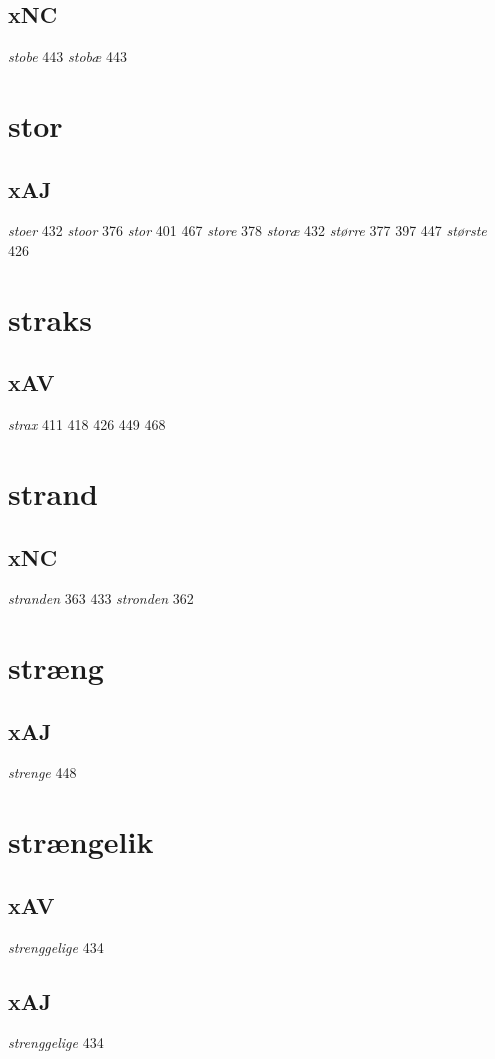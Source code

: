 \documentclass[a4paper,twocolumn]{article}
\begin{document}
\subsection{xNC}
\label{sec:orgc72a3ae}
\emph{stobe} 443 \emph{stobæ} 443 
\section{stor}
\label{sec:orgdd64bbb}
\subsection{xAJ}
\label{sec:org3832dbc}
\emph{stoer} 432 \emph{stoor} 376 \emph{stor} 401 467 \emph{store} 378 \emph{storæ} 432 \emph{større} 377 397 447 \emph{største} 426 
\section{straks}
\label{sec:org5fc1b53}
\subsection{xAV}
\label{sec:org915e22f}
\emph{strax} 411 418 426 449 468 
\section{strand}
\label{sec:orgc49a207}
\subsection{xNC}
\label{sec:orgcd4baf3}
\emph{stranden} 363 433 \emph{stronden} 362 
\section{stræng}
\label{sec:orgc505a92}
\subsection{xAJ}
\label{sec:org795e302}
\emph{strenge} 448 
\section{strængelik}
\label{sec:orgb5d015e}
\subsection{xAV}
\label{sec:orgc70ee7d}
\emph{strenggelige} 434 
\subsection{xAJ}
\label{sec:orgfbb16a1}
\emph{strenggelige} 434 
\end{document}
